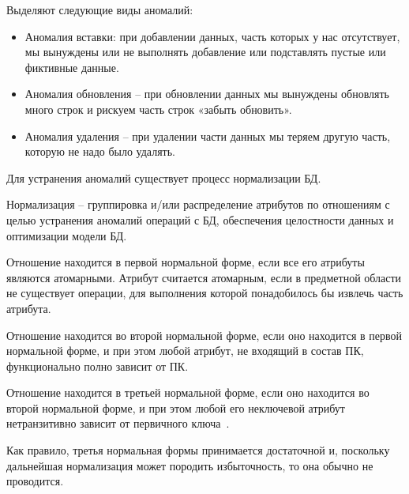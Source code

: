 Выделяют следующие виды аномалий:
\begin{itemize}
	\item Аномалия вставки: при добавлении данных, часть которых у нас отсутствует, мы вынуждены или не выполнять добавление или подставлять пустые или фиктивные данные.
	\item Аномалия обновления – при обновлении данных мы вынуждены обновлять много строк и рискуем часть строк «забыть обновить».
	\item Аномалия удаления – при удалении части данных мы теряем другую часть, которую не надо было удалять.
\end{itemize}

Для устранения аномалий существует процесс нормализации БД.

Нормализация -- группировка и/или распределение атрибутов по отношениям с целью устранения аномалий операций с БД, обеспечения целостности данных и оптимизации модели БД.

Отношение находится в первой нормальной форме, если все его атрибуты являются атомарными. Атрибут считается атомарным, если в предметной области не существует операции, для выполнения которой понадобилось бы извлечь часть атрибута.

Отношение находится во второй нормальной форме, если оно находится в первой нормальной форме, и при этом  любой атрибут, не входящий в состав ПК, функционально полно зависит от ПК.

Отношение находится в третьей нормальной форме, если оно находится во второй нормальной форме, и при этом любой его неключевой атрибут нетранзитивно зависит от первичного ключа~\cite{kulikov_db_workbook}.

Как правило, третья нормальная формы принимается достаточной и, поскольку дальнейшая нормализация может породить избыточность, то она обычно не проводится.
